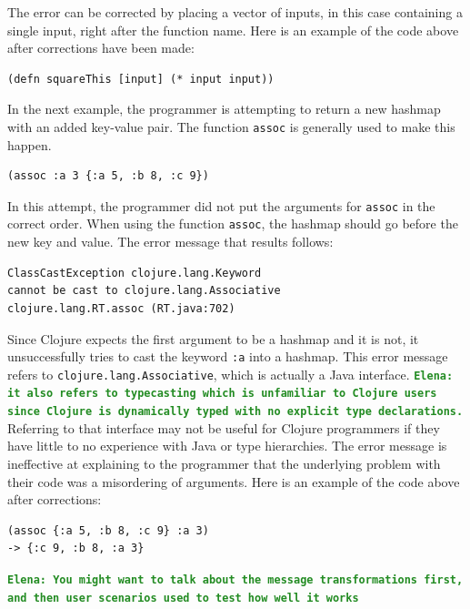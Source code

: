 \documentclass[12pt]{article}
\newcommand{\comment}[1]{{\bf \tt  {#1}}}
\newcommand{\emcomment}[1]{\textcolor{ForestGreen}{\comment{Elena: {#1}}}}
\begin{document}
The error can be corrected by placing a vector of inputs, in this case containing a single input, right after the function name.
Here is an example of the code above after corrections have been made:
\begin{verbatim}
(defn squareThis [input] (* input input))
\end{verbatim}

In the next example, the programmer is attempting to return a new hashmap with an added key-value pair.
The function \texttt{assoc} is generally used to make this happen.
\begin{verbatim}
(assoc :a 3 {:a 5, :b 8, :c 9})
\end{verbatim}

In this attempt, the programmer did not put the arguments for \texttt{assoc} in the correct order.
When using the function \texttt{assoc}, the hashmap should go before the new key and value.
The error message that results follows:

\begin{verbatim}
ClassCastException clojure.lang.Keyword 
cannot be cast to clojure.lang.Associative
clojure.lang.RT.assoc (RT.java:702)
\end{verbatim}

Since Clojure expects the first argument to be a hashmap and it is not, it unsuccessfully tries to cast the keyword \texttt{:a} into a hashmap.
This error message refers to \texttt{clojure.lang.Associative}, which is actually a Java interface.
\emcomment{it also refers to typecasting which is unfamiliar to Clojure users since Clojure is dynamically typed with no explicit type declarations.}
Referring to that interface may not be useful for Clojure programmers if they have little to no experience with Java or type hierarchies.
The error message is ineffective at explaining to the programmer that the underlying problem with their code was a misordering of arguments.
Here is an example of the code above after corrections:
 
\begin{verbatim}
(assoc {:a 5, :b 8, :c 9} :a 3)
-> {:c 9, :b 8, :a 3}
\end{verbatim}

\emcomment{You might want to talk about the message transformations first, and then user scenarios used to test how well it works} 
\end{document}
